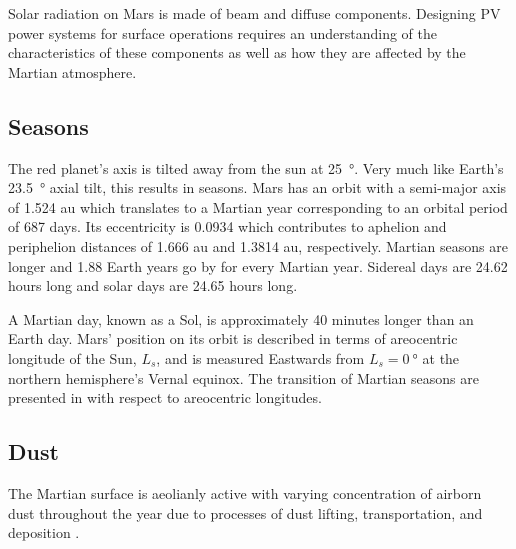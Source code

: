 Solar radiation on Mars is made of beam and diffuse components. Designing \ac{PV} power systems for surface operations requires an understanding of the characteristics of these components as well as how they are affected by the Martian atmosphere.

\subsection{Seasons}
\label{sec:MartianEnvironment:Seasons}
The red planet's axis is tilted away from the sun at \SI{25}{\degree}. Very much like Earth's \SI{23.5}{\degree} axial tilt, this results in seasons. Mars has an orbit with a semi-major axis of 1.524 \si{\astronomicalunit} which translates to a Martian year corresponding to an orbital period of 687 days. Its eccentricity is 0.0934 which contributes to aphelion and periphelion distances of 1.666 \si{\astronomicalunit} and 1.3814 \si{\astronomicalunit}, respectively. Martian seasons are longer and 1.88 Earth years go by for every Martian year. Sidereal days are 24.62 hours long and solar days are 24.65 hours long.



A Martian day, known as a Sol, is approximately 40 minutes longer than an Earth day. Mars' position on its orbit is described in terms of areocentric longitude of the Sun, $L_{s}$, and is measured Eastwards from $L_{s} = \SI{0}{\degree}$ at the northern hemisphere's Vernal equinox. The transition of Martian seasons are presented in  with respect to areocentric longitudes.

\subsection{Dust}
\label{sec:MartianEnvironment:Dust}
The Martian surface is aeolianly active with varying concentration of airborn dust throughout the year due to processes of dust lifting, transportation, and deposition .

